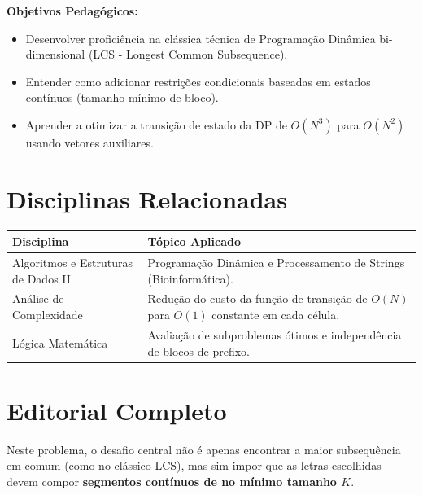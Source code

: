 \documentclass[11pt,a4paper]{article}
\begin{document}

\begin{objetivobox}
\textbf{Objetivos Pedagógicos:}
\begin{itemize}
    \item Desenvolver proficiência na clássica técnica de Programação Dinâmica bi-dimensional (LCS - Longest Common Subsequence).
    \item Entender como adicionar restrições condicionais baseadas em estados contínuos (tamanho mínimo de bloco).
    \item Aprender a otimizar a transição de estado da DP de $O(N^3)$ para $O(N^2)$ usando vetores auxiliares.
\end{itemize}
\end{objetivobox}

\section*{Disciplinas Relacionadas}

\begin{table}[h]
\centering
\begin{tabularx}{\textwidth}{|l|X|}
\hline
\textbf{Disciplina} & \textbf{Tópico Aplicado} \\
\hline
Algoritmos e Estruturas de Dados II & Programação Dinâmica e Processamento de Strings (Bioinformática). \\
\hline
Análise de Complexidade & Redução do custo da função de transição de $O(N)$ para $O(1)$ constante em cada célula. \\
\hline
Lógica Matemática & Avaliação de subproblemas ótimos e independência de blocos de prefixo. \\
\hline
\end{tabularx}
\end{table}


\section*{Editorial Completo}

Neste problema, o desafio central não é apenas encontrar a maior subsequência em comum (como no clássico LCS), mas sim impor que as letras escolhidas devem compor \textbf{segmentos contínuos de no mínimo tamanho $K$}.
\end{document}
